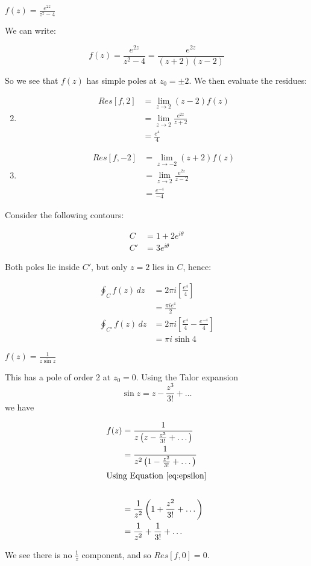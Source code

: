 \documentclass{physics_notes}
\begin{document}
\begin{example}{$f(z) = \frac{e^{2z}}{z^2 - 4}$}

We can write:

\[ f(z) = \frac{e^{2z}}{z^2 - 4} = \frac{e^{2z}}{(z+2)(z-2)} \]

So we see that $f(z)$ has simple poles at $z_0=\pm 2$. We then evaluate the residues:

\begin{enumerate}[label={$z_0=\arabic*$:}]
	\setcounter{enumi}{1}
	\item{
		\begin{align*}
			Res[f,2] &= \lim_{z\to 2} (z-2) f(z) \\
			&= \lim_{z\to 2} \frac{e^{2z}}{z+2} \\
			&= \frac{e^4}{4}
		\end{align*}
	}
	\setcounter{enumi}{-3}
	\item{
		\begin{align*}
			Res[f,-2] &= \lim_{z\to -2} (z+2) f(z) \\
			&= \lim_{z\to 2} \frac{e^{2z}}{z-2} \\
			&= \frac{e^{-4}}{-4}
		\end{align*}
	}
\end{enumerate}

Consider the following contours:

\begin{align*}
	C &= 1 + 2e^{i\theta} \\
	C' &= 3e^{i\theta} 
\end{align*}

Both poles lie inside $C'$, but only $z=2$ lies in $C$, hence:

\begin{align*}
	\oint_C f(z)\, dz &= 2\pi i \left[\frac{e^4}{4}\right] \\
	&= \frac{\pi i e^4}{2} \\
	\oint_{C'} f(z)\, dz &= 2\pi i \left[\frac{e^4}{4} - \frac{e^{-4}}{4}\right] \\
	&= \pi i \sinh{4}
\end{align*}
\end{example}

\begin{example}{$f(z) = \frac{1}{z\sin z}$}

This has a pole of order 2 at $z_0 = 0$. Using the Talor expansion \[ \sin z = z - \frac{z^3}{3!} + \dots \] we have 

\begin{align*} 
f(z) &= \frac{1}{z\left(z - \frac{z^3}{3!} + \dots \right)} \\
&= \frac{1}{z^2 \left(1 - \frac{z^2}{3!} + \dots \right)} \\
\intertext{Using Equation \ref{eq:epsilon}} \\
&= \frac{1}{z^2}\left(1 + \frac{z^2}{3!} + \dots \right) \\
&= \frac{1}{z^2} + \frac{1}{3!} + \dots
\end{align*}

We see there is no $\frac{1}{z}$ component, and so $Res[f,0] = 0$.

\end{example}
\end{document}
